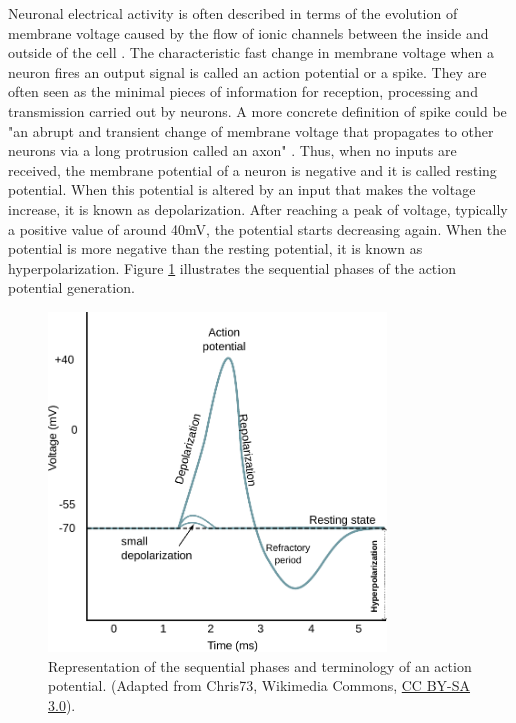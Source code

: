 Neuronal electrical activity is often described in terms of the evolution of membrane voltage caused by the flow of ionic channels between the inside and outside of the cell \parencite{kandel_principles_2012}. The characteristic fast change in membrane voltage when a  neuron fires an output signal is called an action potential or a spike. They are often seen as the minimal pieces of information for reception, processing and transmission carried out by  neurons. A more concrete definition of spike could be "an abrupt and transient change of membrane voltage that propagates to other neurons via a long protrusion called an axon" \parencite{izhikevich_dynamical_2007}. Thus, when no inputs are received, the membrane potential of a neuron is negative and it is called resting potential. When this potential is altered by an input that makes the voltage increase, it is known as depolarization. After reaching a peak of voltage, typically a positive value of around 40mV, the potential starts decreasing again. When the potential is more negative than the resting potential, it is known as hyperpolarization. Figure \ref{fig:action potential} illustrates the sequential phases of the action potential generation. 

\begin{figure}[htb!]
    \centering
    \includegraphics[width=0.8\textwidth]{img/intro/action_potential.pdf}
    \caption{Representation of the sequential  phases and terminology of an action potential. (Adapted from Chris73, Wikimedia Commons, \href{https://creativecommons.org/licenses/by-sa/3.0/}{CC BY-SA 3.0}). }
    \label{fig:action potential}
\end{figure}

